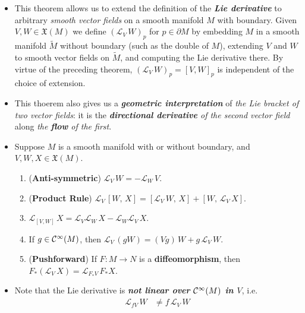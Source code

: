 \documentclass[11pt]{article}
\begin{document}
\begin{itemize}
\item \begin{remark}
This theorem allows us to extend the definition of the \emph{\textbf{Lie derivative}} to arbitrary \emph{smooth vector fields} on a smooth manifold $M$ with boundary. Given $V, W \in \mathfrak{X}(M)$ we define $(\mathscr{L}_{V}\,W)_{p}$ for $p \in \partial M$ by embedding $M$ in a smooth manifold $\widetilde{M}$ without boundary (such as the double of $M$), extending $V$ and $W$ to smooth vector fields on $\widetilde{M}$, and computing the Lie derivative there. By virtue of the preceding theorem,
$(\mathscr{L}_{V}\,W)_{p} = [V, W]_p$ is independent of the choice of extension.
\end{remark}

\item \begin{remark} This thoerem also gives us a \emph{\textbf{geometric interpretation}} of \emph{the Lie bracket of two vector fields}: it is the \emph{\textbf{directional derivative} of the second vector field} along \emph{the \textbf{flow} of the first}. 
\end{remark}

\item \begin{corollary}
Suppose $M$ is a smooth manifold with or without boundary, and $V, W, X \in \mathfrak{X}(M)$.
\begin{enumerate}
\item (\textbf{Anti-symmetric}) $\mathscr{L}_{V}\,W = -\mathscr{L}_{W}\,V$.
\item (\textbf{Product Rule}) $\mathscr{L}_{V}\,[W,\, X] =  [\mathscr{L}_{V}\,W, \,X] + [W,\, \mathscr{L}_{V}\,X]$.
\item $\mathscr{L}_{[V, W]}\,X = \mathscr{L}_{V}\mathscr{L}_{W}\,X - \mathscr{L}_{W}\mathscr{L}_{V}\,X$.
\item If $g \in {\mathcal C}^{\infty}(M)$, then $\mathscr{L}_{V}\,(gW) = (Vg)\,W + g\,\mathscr{L}_{V}\,W$.
\item (\textbf{Pushforward}) If $F: M \rightarrow N$ is a \textbf{diffeomorphism}, then $F_{*}(\mathscr{L}_{V}\,X) = \mathscr{L}_{F_{*}V}\,F_{*}X$.
\end{enumerate}
\end{corollary}

\item \begin{remark}
Note that the Lie derivative is \emph{\textbf{not linear over ${\mathcal C}^{\infty}(M)$ in $V$}}, i.e.
\begin{align*}
\mathscr{L}_{fV}\,W &\neq f\,\mathscr{L}_{V}\,W
\end{align*}
\end{remark}


\end{itemize}
\end{document}

